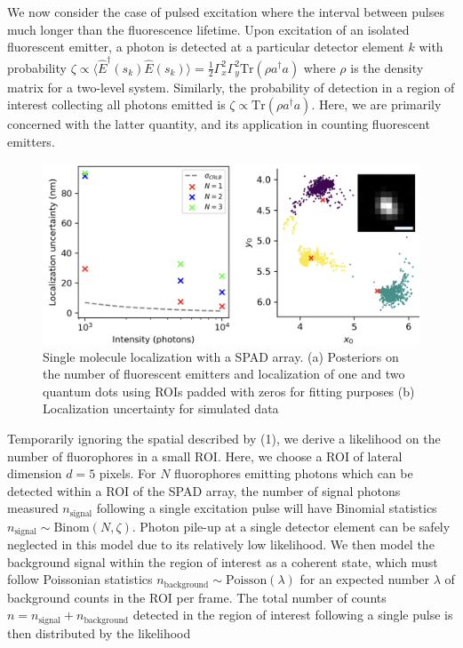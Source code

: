\documentclass[a4paper, twocolumn, superscriptaddress,prl]{revtex4}  %
\begin{document}
We now consider the case of pulsed excitation where the interval between pulses much longer than the fluorescence lifetime. Upon excitation of an isolated fluorescent emitter, a photon is detected at a particular detector element $k$ with probability $\zeta\propto \langle \hat{E}^{\dagger}(s_k)\hat{E}(s_k)\rangle = \frac{1}{2}\Gamma_{x}^2 \Gamma_{y}^2\mathrm{Tr}(\rho a^{\dagger}a)$ where $\rho$ is the density matrix for a two-level system. Similarly, the probability of detection in a region of interest collecting all photons emitted is $\zeta\propto \mathrm{Tr}(\rho a^{\dagger}a)$. Here, we are primarily concerned with the latter quantity, and its application in counting fluorescent emitters.

\begin{figure}
\includegraphics[width=14cm]{Figure-5.png}
\caption{Single molecule localization with a SPAD array. (a) Posteriors on the number of fluorescent emitters and localization of one and two quantum dots using ROIs padded with zeros for fitting purposes (b) Localization uncertainty for simulated data}
\end{figure}   

Temporarily ignoring the spatial described by (1), we derive a likelihood on the number of fluorophores in a small ROI. Here, we choose a ROI of lateral dimension $d = 5$ pixels. For $N$ fluorophores emitting photons which can be detected within a ROI of the SPAD array, the number of signal photons measured $n_{\mathrm{signal}}$ following a single excitation pulse will have Binomial statistics $n_{\mathrm{signal}} \sim \mathrm{Binom}(N,\zeta)$. Photon pile-up at a single detector element can be safely neglected in this model due to its relatively low likelihood. We then model the background signal within the region of interest as a coherent state, which must follow Poissonian statistics $n_{\mathrm{background}} \sim \mathrm{Poisson}(\lambda)$ for an expected number $\lambda$ of background counts in the ROI per frame. The total number of counts $n=n_{\mathrm{signal}}+n_{\mathrm{background}}$ detected in the region of interest following a single pulse is then distributed by the likelihood
\end{document}
